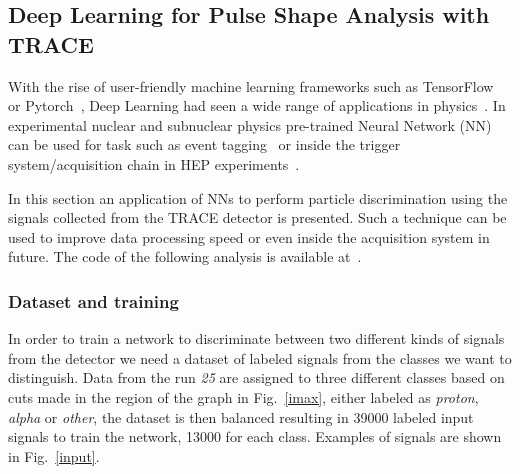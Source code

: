 \subsection{Deep Learning for Pulse Shape Analysis with TRACE}
With the rise of user-friendly machine learning frameworks such as TensorFlow~\cite{tensorflow} or Pytorch~\cite{pytorch}, Deep Learning had seen a wide range of applications in physics~\cite{ml4phys}. In experimental nuclear and subnuclear physics pre-trained Neural Network (NN) can be used for task such as event tagging~\cite{baldi} or inside the trigger system/acquisition chain in HEP experiments~\cite{williams}. 


In this section an application of NNs to perform particle discrimination using the signals collected from the TRACE detector is presented. Such a technique can be used to improve data processing speed or even inside the acquisition system in future.
The code of the following analysis is available at~\cite{github-nn}.

\subsubsection{Dataset and training}

In order to train a network to discriminate between two different kinds of signals from the detector we need a dataset of labeled signals from the classes we want to distinguish. Data from the run \emph{25} are assigned to three different classes based on cuts made in the region of the graph in Fig.~\ref{imax}, either labeled as \emph{proton}, \emph{alpha} or \emph{other}, the dataset is then balanced resulting in \num{39000} labeled input signals to train the network, \num{13000} for each class. Examples of signals are shown in Fig.~\ref{input}.

